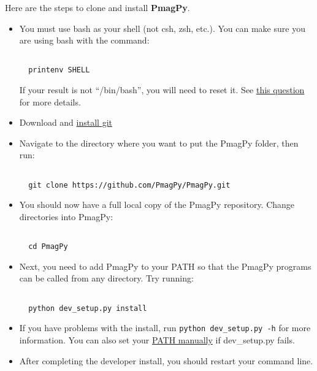 \documentclass[11pt]{article}
\begin{document}
Here are the steps to clone and install {\bf PmagPy}.

\begin{itemize}

\item You must use bash as your shell (not csh, zsh, etc.).  You can make sure you are using bash with the command:
\begin{verbatim}

  printenv SHELL
\end{verbatim}

If your result is not ``/bin/bash'', you will need to reset it.   See \href{https://stackoverflow.com/questions/13046192/changing-default-shell-in-linux}{this question} for more details.

\item Download and \href{https://git-scm.com/downloads}{install git}

  \item Navigate to the directory where you want to put the PmagPy folder, then run:

\begin{verbatim}

  git clone https://github.com/PmagPy/PmagPy.git
\end{verbatim}

\item You should now have a full local copy of the PmagPy repository.  Change directories into PmagPy:

\begin{verbatim}

  cd PmagPy
\end{verbatim}

\item Next, you need to add PmagPy to your PATH so that the PmagPy programs can be called from any directory. Try running:

\begin{verbatim}

  python dev_setup.py install
\end{verbatim}

\item If you have problems with the install, run \verb!python dev_setup.py -h! for more information.  You can also set your \href{https://earthref.org/PmagPy/cookbook/#setting_path}{PATH manually} if dev\_setup.py fails.

\item After completing the developer install, you should restart your command line.

\end{itemize}
\end{document}
